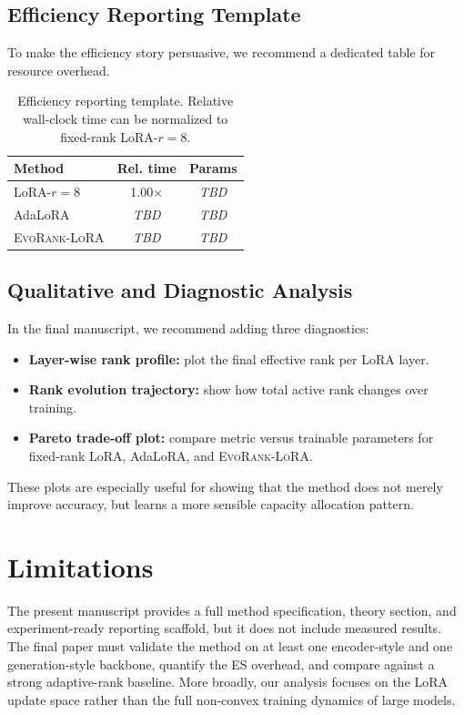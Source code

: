 \documentclass{article}
\newcommand{\method}{\textsc{EvoRank-LoRA}}
\newcommand{\TODO}{\textit{TBD}}
\begin{document}
\subsection{Efficiency Reporting Template}
To make the efficiency story persuasive, we recommend a dedicated table for resource overhead.

\begin{table}[t]
    \centering
    \small
    \caption{Efficiency reporting template. Relative wall-clock time can be normalized to fixed-rank LoRA-$r=8$.}
    \label{tab:efficiency}
    \begin{tabularx}{\columnwidth}{>{\raggedright\arraybackslash}Xcc}
        \toprule
        Method & Rel. time & Params \\
        \midrule
        LoRA-$r=8$ & 1.00$\times$ & \TODO{} \\
        AdaLoRA & \TODO{} & \TODO{} \\
        \method & \TODO{} & \TODO{} \\
        \bottomrule
    \end{tabularx}
\end{table}

\subsection{Qualitative and Diagnostic Analysis}
In the final manuscript, we recommend adding three diagnostics:
\begin{itemize}[leftmargin=1.2em]
    \item \textbf{Layer-wise rank profile:} plot the final effective rank per LoRA layer.
    \item \textbf{Rank evolution trajectory:} show how total active rank changes over training.
    \item \textbf{Pareto trade-off plot:} compare metric versus trainable parameters for fixed-rank LoRA, AdaLoRA, and \method.
\end{itemize}
These plots are especially useful for showing that the method does not merely improve accuracy, but learns a more sensible capacity allocation pattern.

\section{Limitations}
The present manuscript provides a full method specification, theory section, and experiment-ready reporting scaffold, but it does not include measured results. The final paper must validate the method on at least one encoder-style and one generation-style backbone, quantify the ES overhead, and compare against a strong adaptive-rank baseline. More broadly, our analysis focuses on the LoRA update space rather than the full non-convex training dynamics of large models.
\end{document}
